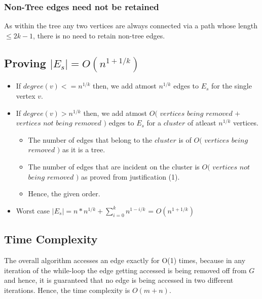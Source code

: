 \documentclass{article}
\begin{document}
\subsubsection{Non-Tree edges need not be retained}
As within the tree any two vertices are always connected via a path whose length $\leq 2k-1$, there is no need to retain non-tree edges.

\subsection{Proving $|E_s| = O(n^{1+1/k}) $}
\begin{itemize}
\item If $degree(v) <= n^{1/k}$ then, we add atmost $n^{1/k}$ edges to $E_s$ for the single vertex $v$.
\item If $degree(v) > n^{1/k}$ then, we add atmost $O($ $vertices$ $being$ $removed$ $ + $ $vertices$ $not$ $being$ $removed$ $)$ edges to $E_s$ for a $cluster$ of atleast $n^{1/k}$ vertices.
\begin{itemize}
\item The number of edges that belong to the $cluster$ is of $O($ $vertices$ $being$ $removed$ $)$ as it is a tree.
\item The number of edges that are incident on the cluster is $O($ $vertices$ $not$ $being$ $removed$ $)$ as proved from justification (1). 
\item Hence, the given order.
\end{itemize}
\item Worst case $|E_s|  =  n*n^{1/k} + \sum_{i=0}^{k} n^{1-i/k}$ = $O(n^{1+1/k})$ 
\end{itemize}
\subsection{Time Complexity}
The overall algorithm accesses an edge exactly for O(1) times, because in any iteration of the while-loop the edge getting accessed is being removed off from $G$ and hence, it is guaranteed that no edge is being accessed in two different iterations. Hence, the time complexity is $O(m+n)$.    
\end{document}
